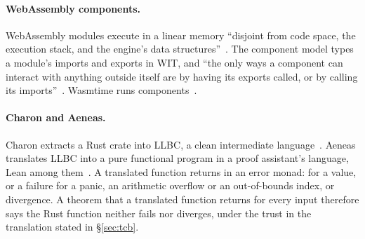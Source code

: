 \paragraph{WebAssembly components.} WebAssembly modules execute in a linear
memory ``disjoint from code space, the execution stack, and the engine's data
structures''~\cite{wasm}. The component model types a module's imports and
exports in WIT, and ``the only ways a component can interact with anything
outside itself are by having its exports called, or by calling its
imports''~\cite{componentModelDocs,componentModel}. Wasmtime runs
components~\cite{wasmtime}.

\paragraph{Charon and Aeneas.} Charon extracts a Rust crate into LLBC, a clean
intermediate language~\cite{charon}. Aeneas translates LLBC into a pure
functional program in a proof assistant's language, Lean among
them~\cite{aeneas,lean4}. A translated function returns in an error monad:
 for a value, or a failure for a panic, an arithmetic overflow or an
out-of-bounds index, or divergence. A theorem that a translated function
returns  for every input therefore says the Rust function neither
fails nor diverges, under the trust in the translation stated in
\S\ref{sec:tcb}.
